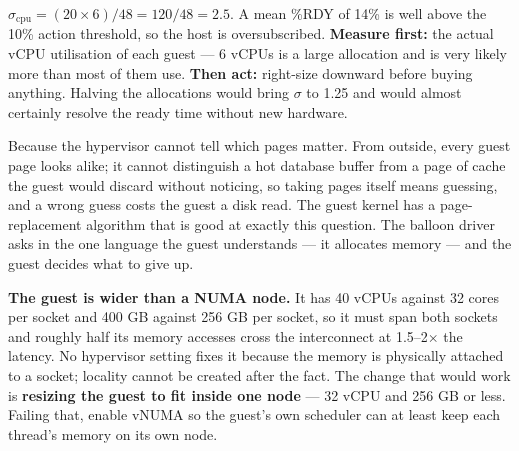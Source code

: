 \begin{ans}
  \item $\sigma_{\text{cpu}} = (20 \times 6)/48 = 120/48 = \mathbf{2.5}$. A mean
        \%RDY of 14\% is well above the 10\% action threshold, so the host is
        oversubscribed. \textbf{Measure first:} the actual vCPU utilisation of
        each guest --- 6 vCPUs is a large allocation and is very likely more
        than most of them use. \textbf{Then act:} right-size downward before
        buying anything. Halving the allocations would bring $\sigma$ to 1.25
        and would almost certainly resolve the ready time without new hardware.
  \item Because the hypervisor cannot tell which pages matter. From outside,
        every guest page looks alike; it cannot distinguish a hot database
        buffer from a page of cache the guest would discard without noticing,
        so taking pages itself means guessing, and a wrong guess costs the guest
        a disk read. The guest kernel has a page-replacement algorithm that is
        good at exactly this question. The balloon driver asks in the one
        language the guest understands --- it allocates memory --- and the guest
        decides what to give up.
  \item \textbf{The guest is wider than a NUMA node.} It has 40 vCPUs against
        32 cores per socket and 400 GB against 256 GB per socket, so it must
        span both sockets and roughly half its memory accesses cross the
        interconnect at 1.5--2$\times$ the latency. No hypervisor setting fixes
        it because the memory is physically attached to a socket; locality
        cannot be created after the fact. The change that would work is
        \textbf{resizing the guest to fit inside one node} --- 32 vCPU and
        256 GB or less. Failing that, enable vNUMA so the guest's own scheduler
        can at least keep each thread's memory on its own node.
\end{ans}

